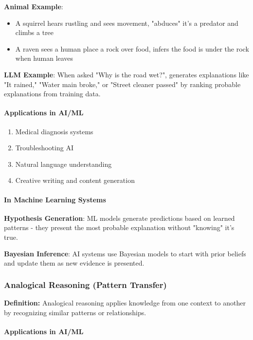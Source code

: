 \textbf{Animal Example}:

\begin{itemize}
\item A squirrel hears rustling and sees movement, "abduces" it's a predator and climbs a tree
\item A raven sees a human place a rock over food, infers the food is under the rock when human leaves
\end{itemize}

\textbf{LLM Example}: When asked "Why is the road wet?", generates explanations like "It rained," "Water main broke," or "Street cleaner passed" by ranking probable explanations from training data.

\paragraph{Applications in AI/ML}
\label{para:abductive-applications}

\begin{enumerate}
\item Medical diagnosis systems
\item Troubleshooting AI
\item Natural language understanding
\item Creative writing and content generation
\end{enumerate}

\paragraph{In Machine Learning Systems}
\label{para:abductive-ml-systems}

\textbf{Hypothesis Generation}: ML models generate predictions based on learned patterns - they present the most probable explanation without "knowing" it's true.

\textbf{Bayesian Inference}: AI systems use Bayesian models to start with prior beliefs and update them as new evidence is presented.

\subsubsection{Analogical Reasoning (Pattern Transfer)}
\label{subsubsec:analogical-reasoning}

\textbf{Definition:} Analogical reasoning applies knowledge from one context to another by recognizing similar patterns or relationships.

\paragraph{Applications in AI/ML}
\label{para:analogical-applications}


